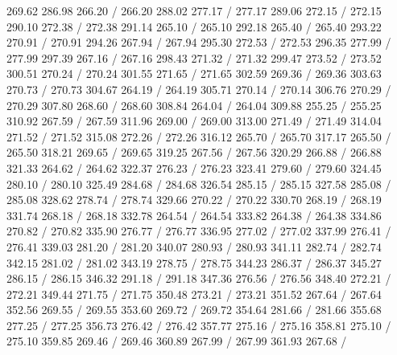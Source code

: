 { 269.62 286.98 266.20 /
 266.20 288.02 277.17 /
 277.17 289.06 272.15 /
 272.15 290.10 272.38 /
 272.38 291.14 265.10 /
 265.10 292.18 265.40 /
 265.40 293.22 270.91 /
 270.91 294.26 267.94 /
 267.94 295.30 272.53 /
 272.53 296.35 277.99 /
 277.99 297.39 267.16 /
 267.16 298.43 271.32 /
 271.32 299.47 273.52 /
 273.52 300.51 270.24 /
 270.24 301.55 271.65 /
 271.65 302.59 269.36 /
 269.36 303.63 270.73 /
 270.73 304.67 264.19 /
 264.19 305.71 270.14 /
 270.14 306.76 270.29 /
 270.29 307.80 268.60 /
 268.60 308.84 264.04 /
 264.04 309.88 255.25 /
 255.25 310.92 267.59 /
 267.59 311.96 269.00 /
 269.00 313.00 271.49 /
 271.49 314.04 271.52 /
 271.52 315.08 272.26 /
 272.26 316.12 265.70 /
 265.70 317.17 265.50 /
 265.50 318.21 269.65 /
 269.65 319.25 267.56 /
 267.56 320.29 266.88 /
 266.88 321.33 264.62 /
 264.62 322.37 276.23 /
 276.23 323.41 279.60 /
 279.60 324.45 280.10 /
 280.10 325.49 284.68 /
 284.68 326.54 285.15 /
 285.15 327.58 285.08 /
 285.08 328.62 278.74 /
 278.74 329.66 270.22 /
 270.22 330.70 268.19 /
 268.19 331.74 268.18 /
 268.18 332.78 264.54 /
 264.54 333.82 264.38 /
 264.38 334.86 270.82 /
 270.82 335.90 276.77 /
 276.77 336.95 277.02 /
 277.02 337.99 276.41 /
 276.41 339.03 281.20 /
 281.20 340.07 280.93 /
 280.93 341.11 282.74 /
 282.74 342.15 281.02 /
 281.02 343.19 278.75 /
 278.75 344.23 286.37 /
 286.37 345.27 286.15 /
 286.15 346.32 291.18 /
 291.18 347.36 276.56 /
 276.56 348.40 272.21 /
 272.21 349.44 271.75 /
 271.75 350.48 273.21 /
 273.21 351.52 267.64 /
 267.64 352.56 269.55 /
 269.55 353.60 269.72 /
 269.72 354.64 281.66 /
 281.66 355.68 277.25 /
 277.25 356.73 276.42 /
 276.42 357.77 275.16 /
 275.16 358.81 275.10 /
 275.10 359.85 269.46 /
 269.46 360.89 267.99 /
 267.99 361.93 267.68 /
}
